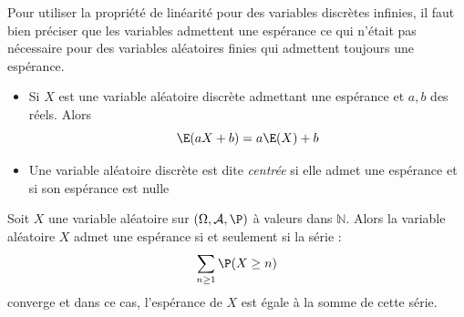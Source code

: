 \documentclass[french,11pt,twoside]{VcCours}
\begin{document}
\begin{Demonstration}{}

\vspace{5cm}
\end{Demonstration}

\begin{Remarque}[\alerte]{} Pour utiliser la propriété de linéarité pour des variables discrètes infinies, il faut bien préciser que les variables admettent une espérance ce qui n'était pas nécessaire pour des variables aléatoires finies qui admettent toujours une espérance.
\end{Remarque} 

\medskip


\begin{Remarques}{}
\begin{itemize}
\item Si $X$ est une variable aléatoire discrète admettant une espérance et $a,b$ des réels. Alors 
$$ \E (aX + b) =a \E(X)+ b $$
\item Une variable aléatoire discrète est dite \emph{centrée} si elle admet une espérance et si son espérance est nulle
\end{itemize}
\end{Remarques}


%
%

\begin{Proposition}{} Soit $X$ une variable aléatoire sur $(\Omega, \mathcal{A}, \P)$ à valeurs dans $\mathbb{N}$. Alors la variable aléatoire $X$ admet une espérance si et seulement si la série :
$$ \sum_{n \geq 1} \P(X \geq n)$$
converge et dans ce cas, l'espérance de $X$ est égale à la somme de cette série.
\end{Proposition}
\end{document}

